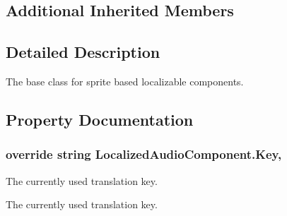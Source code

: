 \subsection*{Additional Inherited Members}


\subsection{Detailed Description}
The base class for sprite based localizable components. 



\subsection{Property Documentation}
\subsubsection[{\texorpdfstring{Key}{Key}}]{\setlength{\rightskip}{0pt plus 5cm}override string Localized\+Audio\+Component.\+Key\hspace{0.3cm}{\ttfamily [get]}, {\ttfamily [set]}}\hypertarget{class_localized_audio_component_aa68a3f40abf5b65a51440ff896e65575}{}\label{class_localized_audio_component_aa68a3f40abf5b65a51440ff896e65575}


The currently used translation key. 

The currently used translation key.